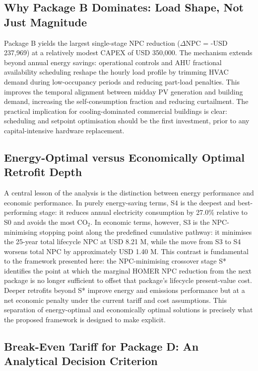 \documentclass[journal,fleqn]{IEEEtran}
\begin{document}
\subsection{Why Package B Dominates: Load Shape, Not Just Magnitude}

Package B yields the largest single-stage NPC reduction ($\Delta$NPC = -USD 237,969) at a relatively modest CAPEX of USD 350,000. The mechanism extends beyond annual energy savings: operational controls and AHU fractional availability scheduling reshape the hourly load profile by trimming HVAC demand during low-occupancy periods and reducing part-load penalties. This improves the temporal alignment between midday PV generation and building demand, increasing the self-consumption fraction and reducing curtailment. The practical implication for cooling-dominated commercial buildings is clear: scheduling and setpoint optimisation should be the first investment, prior to any capital-intensive hardware replacement.


\subsection{Energy-Optimal versus Economically Optimal Retrofit Depth}

A central lesson of the analysis is the distinction between energy performance and economic performance. In purely energy-saving terms, S4 is the deepest and best-performing stage: it reduces annual electricity consumption by 27.0\% relative to S0 and avoids the most CO$_{2}$. In economic terms, however, S3 is the NPC-minimising stopping point along the predefined cumulative pathway: it minimises the 25-year total lifecycle NPC at USD 8.21 M, while the move from S3 to S4 worsens total NPC by approximately USD 1.40 M. This contrast is fundamental to the framework presented here: the NPC-minimising crossover stage S* identifies the point at which the marginal HOMER NPC reduction from the next package is no longer sufficient to offset that package's lifecycle present-value cost. Deeper retrofits beyond S* improve energy and emissions performance but at a net economic penalty under the current tariff and cost assumptions. This separation of energy-optimal and economically optimal solutions is precisely what the proposed framework is designed to make explicit.


\subsection{Break-Even Tariff for Package D: An Analytical Decision Criterion}
\end{document}
